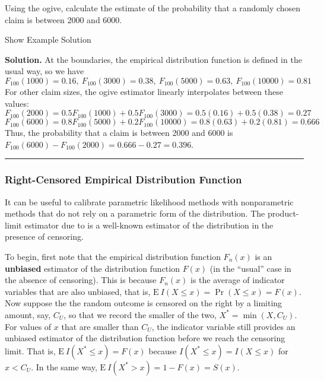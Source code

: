 \documentclass[]{book}
\theoremstyle{definition}
\theoremstyle{definition}
\theoremstyle{definition}
\theoremstyle{remark}
\begin{document}
Using the ogive, calculate the estimate of the probability that a
randomly chosen claim is between 2000 and 6000.

Show Example Solution

\hypertarget{toggleExampleSelect.3.4}{}
\textbf{Solution.} At the boundaries, the empirical distribution
function is defined in the usual way, so we have
\[F_{100}(1000) = 0.16, \ F_{100}(3000)=0.38, \ F_{100}(5000)=0.63, \ F_{100}(10000)=0.81\]
For other claim sizes, the ogive estimator linearly interpolates between
these values:
\[F_{100}(2000) = 0.5F_{100}(1000) + 0.5F_{100}(3000) = 0.5(0.16)+0.5(0.38)=0.27\]
\[F_{100}(6000)=0.8F_{100}(5000)+0.2F_{100}(10000) = 0.8(0.63)+0.2(0.81)=0.666\]
Thus, the probability that a claim is between 2000 and 6000 is
\(F_{100}(6000) - F_{100}(2000) = 0.666-0.27 = 0.396\).

\begin{center}\rule{0.5\linewidth}{\linethickness}\end{center}

\subsubsection{Right-Censored Empirical Distribution
Function}\label{right-censored-empirical-distribution-function}

It can be useful to calibrate parametric likelihood methods with
nonparametric methods that do not rely on a parametric form of the
distribution. The product-limit estimator due to \citep{kaplan1958} is a
well-known estimator of the distribution in the presence of censoring.

To begin, first note that the empirical distribution function \(F_n(x)\)
is an \textbf{unbiased} estimator of the distribution function \(F(x)\)
(in the ``usual'' case in the absence of censoring). This is because
\(F_n(x)\) is the average of indicator variables that are also unbiased,
that is, \(\mathrm{E~} I(X \le x) = \Pr(X \le x) = F(x)\). Now suppose
the the random outcome is censored on the right by a limiting amount,
say, \(C_U\), so that we record the smaller of the two,
\(X^* = \min(X, C_U)\). For values of \(x\) that are smaller than
\(C_U\), the indicator variable still provides an unbiased estimator of
the distribution function before we reach the censoring limit. That is,
\(\mathrm{E~} I(X^* \le x) = F(x)\) because
\(I(X^* \le x) = I(X \le x)\) for \(x < C_U\). In the same way,
\(\mathrm{E~} I(X^* > x) = 1 -F(x) = S(x)\).
\end{document}
